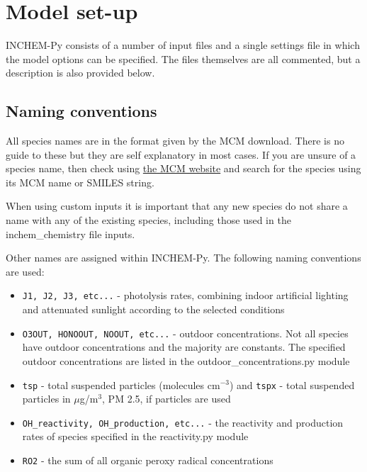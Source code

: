 \documentclass[a4paper]{refart}
\begin{document}
\newpage
\section{Model set-up}
INCHEM-Py consists of a number of input files and a single settings file in which the model options can be specified. The files themselves are all commented, but a description is also provided below.

\subsection{Naming conventions}\label{Naming conventions}
All species names are in the format given by the MCM download. There is no guide to these but they are self explanatory in most cases. If you are unsure of a species name, then check using \href{http://mcm.leeds.ac.uk/MCM/}{the MCM website} and search for the species using its MCM name or SMILES string.

When using custom inputs it is important that any new species do not share a name with any of the existing species, including those used in the inchem\_chemistry file inputs.

Other names are assigned within INCHEM-Py. The following naming conventions are used:
\begin{itemize}
    \item \texttt{J1, J2, J3, etc...} - photolysis rates, combining indoor artificial lighting and attenuated sunlight according to the selected conditions 
    \item \texttt{O3OUT, HONOOUT, NOOUT, etc...} - outdoor concentrations. Not all species have outdoor concentrations and the majority are constants. The specified outdoor concentrations are listed in the outdoor\_concentrations.py module
    \item \texttt{tsp} - total suspended particles (molecules cm$^{-3}$) and \texttt{tspx} - total suspended particles in $\mu$g/m$^3$, PM 2.5, if particles are used 
    \item \texttt{OH\_reactivity, OH\_production, etc...} - the reactivity and production rates of species specified in the reactivity.py module 
    \item \texttt{RO2} - the sum of all organic peroxy radical concentrations
\end{itemize}
\end{document}

